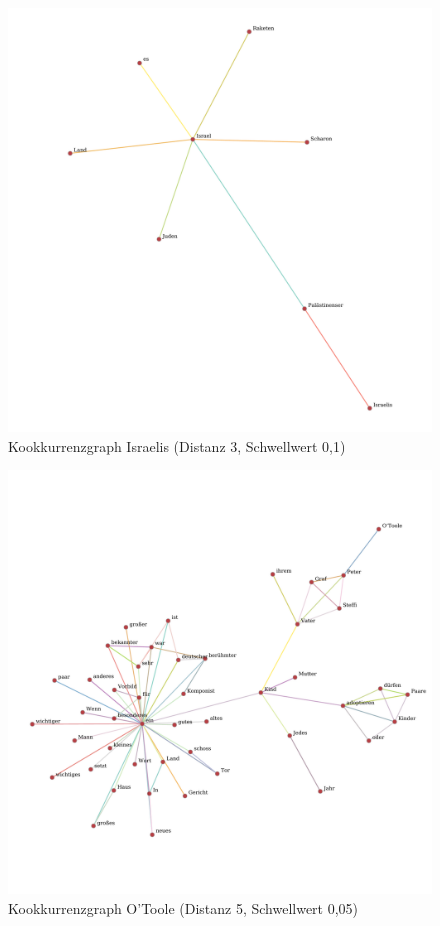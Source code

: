 \documentclass[11pt, a4paper]{article}
\begin{document}
\begin{figure}[hp!]
    \centering
        \includegraphics[scale=.4]{../../data/results/longpath_wordgraphs/nl/graph_Israelis.pdf}
    \caption{Kookkurrenzgraph Israelis (Distanz 3, Schwellwert 0,1)}
\end{figure}

\begin{figure}[hp!]
    \centering
        \includegraphics[scale=.4]{../../data/results/longpath_wordgraphs/nl/graph_OToole.pdf}
    \caption{Kookkurrenzgraph O’Toole (Distanz 5, Schwellwert 0,05)}
\end{figure}
\end{document}

